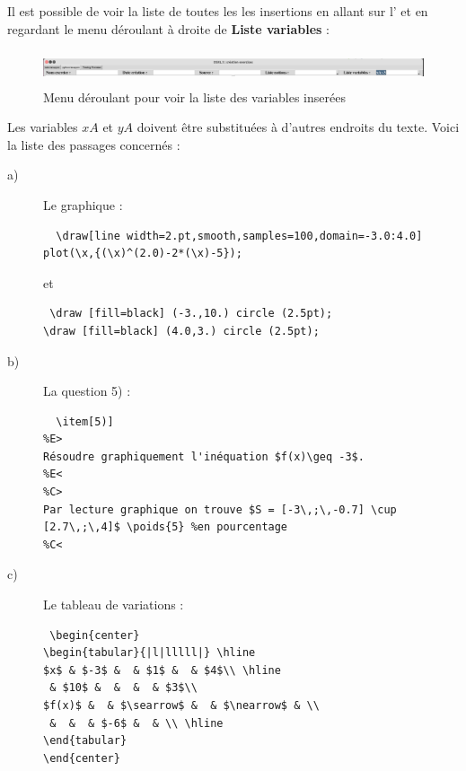 {\begin{remarque}
 Il est possible de voir la liste de toutes les les insertions en allant sur l' et en regardant le menu déroulant à droite de {\bf Liste variables} :
 \begin{figure}[h]
 \centering
 \includegraphics[width=18cm,height=1cm]{./images/creation_exercice_var_02.png}
 \caption{Menu déroulant pour voir la liste des variables inserées}
 \label{fig: var 02}
\end{figure}
\end{remarque}

Les variables $xA$ et $yA$ doivent être substituées à d'autres endroits du texte. 
Voici la liste des passages concernés :
\begin{description}
 \item[a)] Le graphique :
 \begin{verbatim}
  \draw[line width=2.pt,smooth,samples=100,domain=-3.0:4.0] plot(\x,{(\x)^(2.0)-2*(\x)-5});
 \end{verbatim}
 et 
 \begin{verbatim}
 \draw [fill=black] (-3.,10.) circle (2.5pt);
\draw [fill=black] (4.0,3.) circle (2.5pt);
 \end{verbatim}
 \item[b)] La question 5) :
 \begin{verbatim}
  \item[5)]  
%E>
Résoudre graphiquement l'inéquation $f(x)\geq -3$.
%E<
%C>
Par lecture graphique on trouve $S = [-3\,;\,-0.7] \cup  [2.7\,;\,4]$ \poids{5} %en pourcentage
%C<
 \end{verbatim}
\item[c)] Le tableau de variations :
\begin{verbatim}
 \begin{center}
\begin{tabular}{|l|lllll|} \hline
$x$ & $-3$ &  & $1$ &  & $4$\\ \hline
 & $10$ &  &  &  & $3$\\ 
$f(x)$ &  & $\searrow$ &  & $\nearrow$ & \\
 &  &  & $-6$ &  & \\ \hline
\end{tabular}
\end{center}
\end{verbatim}


\end{description}}
